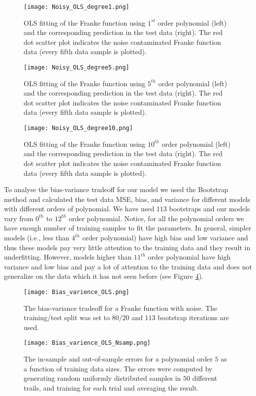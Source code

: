 \documentclass[a4paper]{article}
\begin{document}
\begin{figure}[H]
  \centering
  \texttt{[image: Noisy\_OLS\_degree1.png]}
  \caption{OLS fitting of the Franke function using $1^{st}$ order polynomial (left) and the corresponding prediction in the test data (right). The red dot scatter plot indicates the noise contaminated Franke function data (every fifth data sample is plotted).}
    \label{Noisy_OLS_degree1}
\end{figure}
\begin{figure}[H]
  \centering
  \texttt{[image: Noisy\_OLS\_degree5.png]}
  \caption{OLS fitting of the Franke function using $5^{th}$ order polynomial (left) and the corresponding prediction in the test data (right). The red dot scatter plot indicates the noise contaminated Franke function data (every fifth data sample is plotted).}
    \label{Noisy_OLS_degree5}
\end{figure}
\begin{figure}[H]
  \centering
  \texttt{[image: Noisy\_OLS\_degree10.png]}
  \caption{OLS fitting of the Franke function using $10^{th}$ order polynomial (left) and the corresponding prediction in the test data (right). The red dot scatter plot indicates the noise contaminated Franke function data (every fifth data sample is plotted).}
    \label{Noisy_OLS_degree10}
\end{figure}

To analyse the bias-variance tradeoff for our model we used the Bootstrap method and calculated the test data MSE, bias, and variance for different models with different orders of polynomial. We have used $113$ bootstraps and our models vary from $0^{th}$ to $12^{th}$ order polynomial. Notice, for all the polynomial orders we have enough number of training samples to fit the parameters. In general, simpler models (i.e., less than $4^{th}$ order polynomial) have high bias and low variance and thus these models pay very little attention to the training data and they result in underfitting. However, models higher than $11^{th}$ order polynomial have high variance and low bias and pay a lot of attention to the training data and does not generalize on the data which it has not seen before (see Figure \ref{Bias_varience_OLS}). 
\begin{figure}[H]
  \centering
  \texttt{[image: Bias\_varience\_OLS.png]}
  \caption{The bias-variance tradeoff for a Franke function with noise. The training/test split was set to $80/20$ and $113$ bootstrap iterations are used.}
    \label{Bias_varience_OLS}
    
\end{figure}
\begin{figure}[H]
  \centering
  \texttt{[image: Bias\_varience\_OLS\_Nsamp.png]}
  \caption{The in-sample and out-of-sample
errors for a polynomial order $5$ as a function of training data sizes. The errors were computed by generating random uniformly distributed samples in  $50$ different trails, and training for each trial and averaging the result.}
    \label{Bias_varience_OLS_nsamp}
\end{figure}
\end{document}
